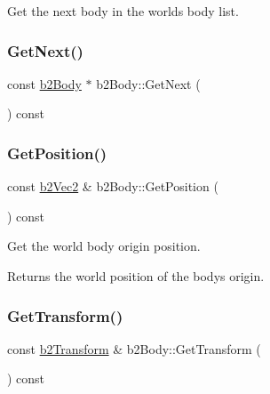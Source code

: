Get the next body in the world\textquotesingle{}s body list. 

\mbox{\label{classb2_body_aa118d06e0ae6444c02bb5d22bb448269}} 
\subsubsection{\texorpdfstring{GetNext()}{GetNext()}\hspace{0.1cm}{\footnotesize\ttfamily [2/2]}}
{\footnotesize\ttfamily const \mbox{\hyperlink{classb2_body}{b2\+Body}} $\ast$ b2\+Body\+::\+Get\+Next (\begin{DoxyParamCaption}{ }\end{DoxyParamCaption}) const\hspace{0.3cm}{\ttfamily [inline]}}

\mbox{\label{classb2_body_a7944dc953ac0cb1e00b32bc61b50e70d}} 
\subsubsection{\texorpdfstring{GetPosition()}{GetPosition()}}
{\footnotesize\ttfamily const \mbox{\hyperlink{structb2_vec2}{b2\+Vec2}} \& b2\+Body\+::\+Get\+Position (\begin{DoxyParamCaption}{ }\end{DoxyParamCaption}) const\hspace{0.3cm}{\ttfamily [inline]}}

Get the world body origin position. \begin{DoxyReturn}{Returns}
the world position of the body\textquotesingle{}s origin. 
\end{DoxyReturn}
\mbox{\label{classb2_body_afb316448e6e555ceb2df23ed216b2f53}} 
\subsubsection{\texorpdfstring{GetTransform()}{GetTransform()}}
{\footnotesize\ttfamily const \mbox{\hyperlink{structb2_transform}{b2\+Transform}} \& b2\+Body\+::\+Get\+Transform (\begin{DoxyParamCaption}{ }\end{DoxyParamCaption}) const\hspace{0.3cm}{\ttfamily [inline]}}

